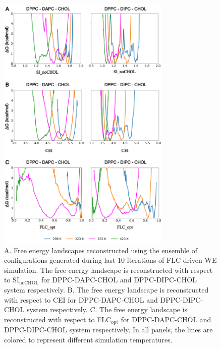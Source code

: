 \documentclass{biophys-new}
\begin{document}
\begin{figure}[hbt!]
    \centering
    \includegraphics[width=3.25in]{Figures/Main/6/placeholder_v0.jpg}
    \caption{A. Free energy landscapes reconstructed using the ensemble of configurations generated during last 10 iterations of FLC-driven WE simulation. The free energy landscape is reconstructed with respect to $\text{SI}_{\text{noCHOL}}$ for DPPC-DAPC-CHOL and DPPC-DIPC-CHOL system respectively. B. The free energy landscape is reconstructed with respect to CEI for DPPC-DAPC-CHOL and DPPC-DIPC-CHOL system respectively. C. The free energy landscape is reconstructed with respect to FLC$_{\text{opt}}$ for DPPC-DAPC-CHOL and DPPC-DIPC-CHOL system respectively. In all panels, the lines are colored to represent different simulation temperatures.
    \label{figs6:view}}
\end{figure}
\end{document}
